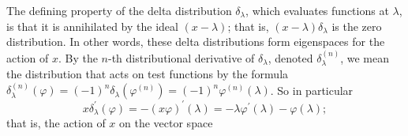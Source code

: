 \documentclass[11pt,leqno]{article}
\theoremstyle{plain}
\theoremstyle{definition}
\numberwithin{equation}{section}
\numberwithin{lem}{section}
\begin{document}
The defining property of the delta distribution $\delta_\lambda$, which evaluates functions at $\lambda$, is that it is annihilated by the ideal $(x-\lambda)$; that is, $(x-\lambda)\delta_\lambda$ is the zero distribution. In other words, these delta distributions form eigenspaces for the action of $x$. By the $n$-th distributional derivative of $\delta_\lambda$, denoted $\delta_\lambda^{(n)}$, we mean the distribution that acts on test functions by the formula $\delta_\lambda^{(n)}(\varphi) = (-1)^n\delta_\lambda(\varphi^{(n)}) = (-1)^n\varphi^{(n)}(\lambda)$. So in particular 
\[x\delta_\lambda^\prime(\varphi) = -(x\varphi)^\prime(\lambda) = -\lambda \varphi^\prime(\lambda) - \varphi(\lambda);\]
that is, the action of $x$ on the vector space 


\end{document}
